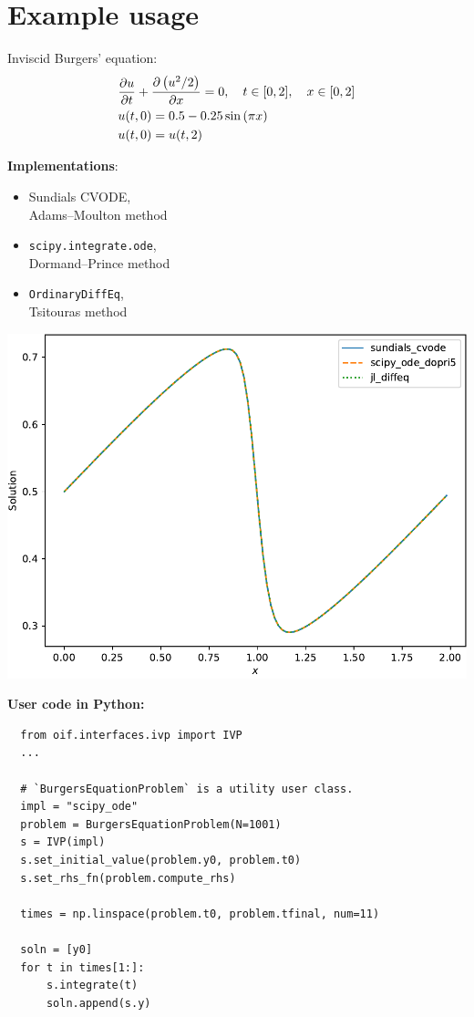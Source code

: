 \documentclass{mmposter}
\begin{document}
\section*{Example usage}
Inviscid Burgers' equation:
\begin{align*}
  &\pdv{u}{t} + \pdv{\left( u^{2} / 2 \right)}{x} = 0,
  \quad t \in [0, 2], \quad x \in [0, 2] \\
  &u(t, 0) = 0.5 - 0.25 \sin \left( \pi x \right)\\
  &u(t, 0) = u(t, 2)
\end{align*}
\begin{minipage}{\dimexpr0.46\columnwidth - 2\tabcolsep}
  \textbf{Implementations}:
  \begin{itemize}
    \item Sundials CVODE,\\Adams--Moulton method
    \item \texttt{scipy.integrate.ode},\\Dormand--Prince method
    \item \texttt{OrdinaryDiffEq},\\Tsitouras method
  \end{itemize}
\end{minipage}\hfill%
\begin{minipage}{\dimexpr0.54\columnwidth - 2\tabcolsep}
  \includegraphics[width=\linewidth]{ivp_c_burgers_eq}
\end{minipage}

\vspace{2em}
\textbf{User code in Python:}
\begin{verbatim}
  from oif.interfaces.ivp import IVP
  ...

  # `BurgersEquationProblem` is a utility user class.
  impl = "scipy_ode"
  problem = BurgersEquationProblem(N=1001)
  s = IVP(impl)
  s.set_initial_value(problem.y0, problem.t0)
  s.set_rhs_fn(problem.compute_rhs)

  times = np.linspace(problem.t0, problem.tfinal, num=11)

  soln = [y0]
  for t in times[1:]:
      s.integrate(t)
      soln.append(s.y)
\end{verbatim}
\end{document}
